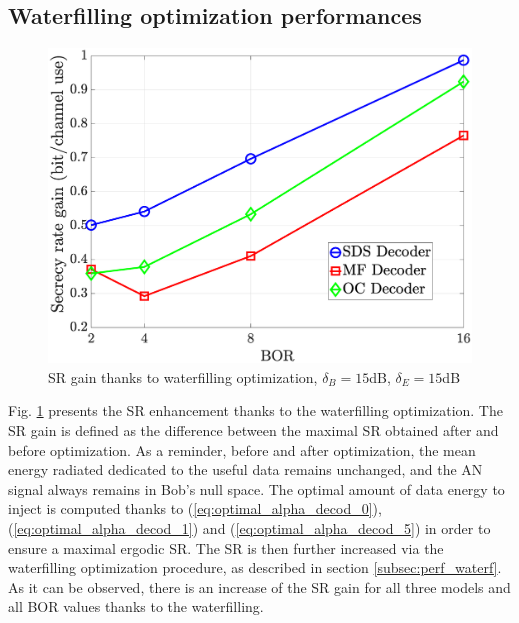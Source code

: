 \documentclass[journal,comsoc]{IEEEtran}
\let\MYoriglatexcaption\caption
\renewcommand{\caption}[2][\relax]{\MYoriglatexcaption[#2]{#2}}
\begin{document}
\subsection{Waterfilling optimization performances}
\begin{figure}[h!t]
	\centering
	\includegraphics[width=1\linewidth]{graphs/SR_gain.eps}
	\caption{SR gain thanks to waterfilling optimization, $\delta_B  = 15$dB, $\delta_E = 15$dB}
	\label{fig_waterfilling_opt}
\end{figure}
Fig. \ref{fig_waterfilling_opt} presents the SR enhancement thanks to the waterfilling optimization. The SR gain is defined as the difference between the maximal SR obtained after and before optimization. As a reminder, before and after optimization, the mean energy radiated dedicated to the useful data remains unchanged, and the AN signal always remains in Bob's null space. The optimal amount of data energy to inject is computed thanks to (\ref{eq:optimal_alpha_decod_0}), (\ref{eq:optimal_alpha_decod_1}) and (\ref{eq:optimal_alpha_decod_5}) in order to ensure a maximal ergodic SR. The SR is then further increased via the waterfilling optimization procedure, as described in section \ref{subsec:perf_waterf}. As it can be observed, there is an increase of the SR gain for all three models and all BOR values thanks to the waterfilling. 

\end{document}
